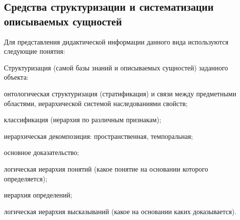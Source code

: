 \subsection{Средства структуризации и систематизации описываемых сущностей}
\label{subsec_means_structuring_systematizing_described_entities}
Для представления дидактической информации данного вида используются следующие понятия:
\begin{SCn}
	\begin{scnitemize}
		\item {}
		\item {}
		\item {}
		\item {}
		\item {}
		\item {}
		\item {}
	\end{scnitemize}
\end{SCn}

Структуризация (самой базы знаний и описываемых сущностей) заданного объекта:
\begin{textitemize}
	\item онтологическая структуризация (стратификация) и связи между предметными областями, иерархической системой наследованиями свойств;
	\item классификация (иерархия по различным признакам);
	\item иерархическая декомпозиция: пространственная, темпоральная;
	\item основное доказательство;
	\item логическая иерархия понятий (какое понятие на основании которого определяется);
	\item  иерархия определений;
	\item логическая иерархия высказываний (какое на основании каких доказывается).
\end{textitemize}

